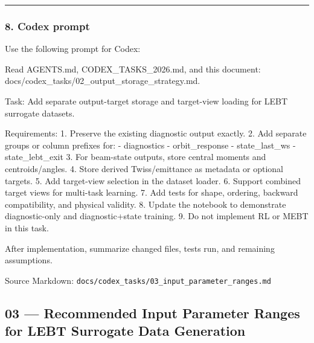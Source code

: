 \documentclass[
]{article}
\newenvironment{Shaded}{}{}
\newcommand{\NormalTok}[1]{#1}
\begin{document}
\begin{center}\rule{0.5\linewidth}{0.5pt}\end{center}

\hypertarget{codex-prompt-1}{%
\subsubsection{8. Codex prompt}\label{codex-prompt-1}}

Use the following prompt for Codex:

\begin{Shaded}
\begin{Highlighting}[]
\NormalTok{Read AGENTS.md, CODEX\_TASKS\_2026.md, and this document:}
\NormalTok{docs/codex\_tasks/02\_output\_storage\_strategy.md.}

\NormalTok{Task:}
\NormalTok{Add separate output{-}target storage and target{-}view loading for LEBT surrogate datasets.}

\NormalTok{Requirements:}
\NormalTok{1. Preserve the existing diagnostic output exactly.}
\NormalTok{2. Add separate groups or column prefixes for:}
\NormalTok{   {-} diagnostics}
\NormalTok{   {-} orbit\_response}
\NormalTok{   {-} state\_last\_ws}
\NormalTok{   {-} state\_lebt\_exit}
\NormalTok{3. For beam{-}state outputs, store central moments and centroids/angles.}
\NormalTok{4. Store derived Twiss/emittance as metadata or optional targets.}
\NormalTok{5. Add target{-}view selection in the dataset loader.}
\NormalTok{6. Support combined target views for multi{-}task learning.}
\NormalTok{7. Add tests for shape, ordering, backward compatibility, and physical validity.}
\NormalTok{8. Update the notebook to demonstrate diagnostic{-}only and diagnostic+state training.}
\NormalTok{9. Do not implement RL or MEBT in this task.}

\NormalTok{After implementation, summarize changed files, tests run, and remaining assumptions.}
\end{Highlighting}
\end{Shaded}

Source Markdown:
\texttt{docs/codex\_tasks/03\_input\_parameter\_ranges.md}

\hypertarget{recommended-input-parameter-ranges-for-lebt-surrogate-data-generation}{%
\subsection{03 --- Recommended Input Parameter Ranges for LEBT Surrogate
Data
Generation}\label{recommended-input-parameter-ranges-for-lebt-surrogate-data-generation}}
\end{document}
